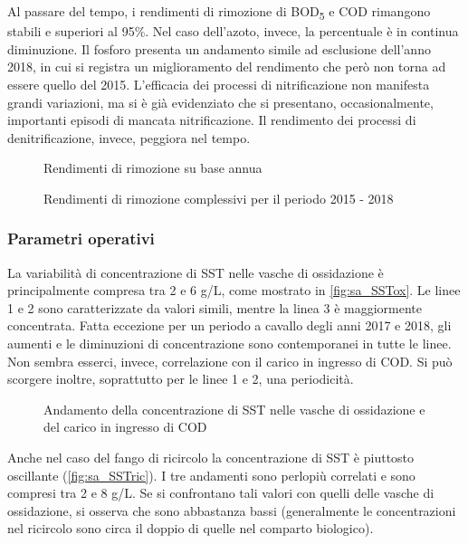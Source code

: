 Al passare del tempo, i rendimenti di rimozione di BOD\textsubscript{5} e COD rimangono stabili e superiori al 95\%. Nel caso dell'azoto, invece, la percentuale è in continua diminuzione. Il fosforo presenta un andamento simile ad esclusione dell'anno 2018, in cui si registra un miglioramento del rendimento che però non torna ad essere quello del 2015.
L'efficacia dei processi di nitrificazione non manifesta grandi variazioni, ma si è già evidenziato che si presentano, occasionalmente, importanti episodi di mancata nitrificazione. Il rendimento dei processi di denitrificazione, invece, peggiora nel tempo.
\begin{figure}[H]
		\centering
	\caption{Rendimenti di rimozione su base annua}
	\label{fig:sa_rendanni}
\end{figure}
\begin{figure}[H]
		\centering
	\caption{Rendimenti di rimozione complessivi per il periodo 2015 - 2018}
	\label{fig:sa_rendtot}
\end{figure}

\subsubsection{Parametri operativi}

La variabilità di concentrazione di SST nelle vasche di ossidazione è principalmente compresa tra 2 e 6 g/L, come mostrato in \autoref{fig:sa_SSTox}. Le linee 1 e 2 sono caratterizzate da valori simili, mentre la linea 3 è maggiormente concentrata. Fatta eccezione per un periodo a cavallo degli anni 2017 e 2018, gli aumenti e le diminuzioni di concentrazione sono contemporanei in tutte le linee. Non sembra esserci, invece, correlazione con il carico in ingresso di COD. Si può scorgere inoltre, soprattutto per le linee 1 e 2, una periodicità.

\begin{figure}[H]
		\centering
	\caption{Andamento della concentrazione di SST nelle vasche di ossidazione e del carico in ingresso di COD}
	\label{fig:sa_SSTox}
\end{figure}

Anche nel caso del fango di ricircolo la concentrazione di SST è piuttosto oscillante (\autoref{fig:sa_SSTric}). I tre andamenti sono perlopiù correlati e sono compresi tra 2 e 8 g/L. Se si confrontano tali valori con quelli  delle vasche di ossidazione, si osserva che sono abbastanza bassi (generalmente le concentrazioni nel ricircolo sono circa il doppio di quelle nel comparto biologico).

